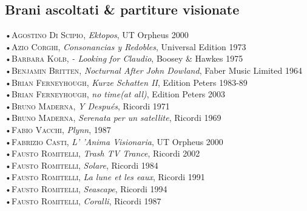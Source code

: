 \documentclass[oneside]{article}
\begin{document}
\begin{multicols*}{2}
\section{ Brani ascoltati \& partiture visionate}
•\textsc{\textsf {Agostino Di Scipio}}, \emph{Ektopos}, UT Orpheus 2000\\\newline
•\textsc{\textsf {Azio Corghi}}, \emph{Consonancias y Redobles}, Universal Edition 1973\\\newline
•\textsc{\textsf {Barbara Kolb}}, \emph{ - Looking for Claudio}, Boosey \& Hawkes 1975\\\newline
•\textsc{\textsf {Benjamin Britten}}, \emph{Nocturnal After John Dowland}, Faber Music Limited 1964\\\newline
•\textsc{\textsf {Brian Ferneyhough}}, \emph{Kurze Schatten II}, Edition Peters 1983-89\\\newline
•\textsc{\textsf {Brian Ferneyhough}}, \emph{no time(at all)}, Edition Peters 2003\\\newline
•\textsc{\textsf {Bruno Maderna}}, \emph{Y Después}, Ricordi 1971\\\newline
•\textsc{\textsf {Bruno Maderna}}, \emph{Serenata per un satellite}, Ricordi 1969\\\newline
•\textsc{\textsf {Fabio Vacchi}}, \emph{Plynn}, 1987\\\newline
•\textsc{\textsf {Fabrizio Casti}}, \emph{ L' 'Anima Visionaria}, UT Orpheus 2000\\\newline
•\textsc{\textsf {Fausto Romitelli}}, \emph{Trash TV Trance}, Ricordi 2002\\\newline
•\textsc{\textsf {Fausto Romitelli}}, \emph{Solare}, Ricordi 1984\\\newline
•\textsc{\textsf {Fausto Romitelli}}, \emph{La lune et les eaux}, Ricordi 1991\\\newline
•\textsc{\textsf {Fausto Romitelli}}, \emph{Seascape}, Ricordi 1994\\\newline
•\textsc{\textsf {Fausto Romitelli}}, \emph{Coralli}, Ricordi 1987\\\newline

\end{multicols*}
\end{document}
